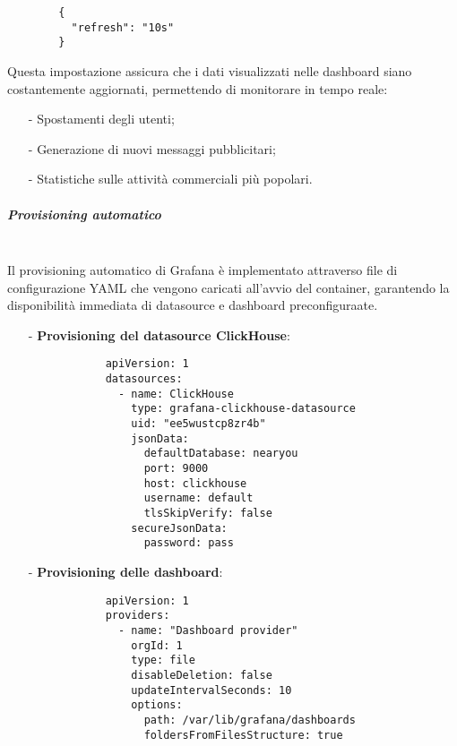 \documentclass[10pt]{article}
\newcommand{\mysubparagraph}[1]{\subparagraph{#1}\mbox{}\\}
\begin{document}
        \begin{lstlisting}
        {
          "refresh": "10s"
        }
        \end{lstlisting}
        
        Questa impostazione assicura che i dati visualizzati nelle dashboard siano costantemente aggiornati, permettendo di monitorare in tempo reale:
        \begin{itemize}
            \item[-] Spostamenti degli utenti;
            \item[-] Generazione di nuovi messaggi pubblicitari;
            \item[-] Statistiche sulle attività commerciali più popolari.
        \end{itemize}
        
        \mysubparagraph{Provisioning automatico}
        Il provisioning automatico di Grafana è implementato attraverso file di configurazione YAML che vengono caricati all'avvio del container, garantendo la disponibilità immediata di datasource e dashboard preconfiguraate.
        
        \begin{itemize}
            \item[-] \textbf{Provisioning del datasource ClickHouse}:
            \begin{lstlisting}
            apiVersion: 1
            datasources:
              - name: ClickHouse
                type: grafana-clickhouse-datasource
                uid: "ee5wustcp8zr4b"
                jsonData:
                  defaultDatabase: nearyou
                  port: 9000
                  host: clickhouse
                  username: default
                  tlsSkipVerify: false
                secureJsonData:
                  password: pass
            \end{lstlisting}
        
            \item[-] \textbf{Provisioning delle dashboard}:
            \begin{lstlisting}
            apiVersion: 1
            providers:
              - name: "Dashboard provider"
                orgId: 1
                type: file
                disableDeletion: false
                updateIntervalSeconds: 10
                options:
                  path: /var/lib/grafana/dashboards
                  foldersFromFilesStructure: true
            \end{lstlisting}
        \end{itemize}
        
\end{document}

